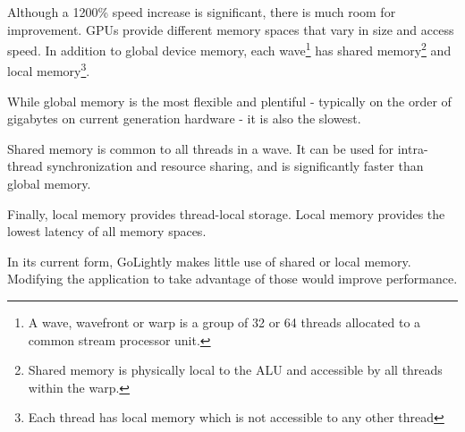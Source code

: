Although a 1200\% speed increase is significant, there is much room for improvement. GPUs provide different memory spaces that vary in size and access speed. In addition to global device memory, each wave\footnote{A wave, wavefront or warp is a group of 32 or 64 threads allocated to a common stream processor unit.} has shared memory\footnote{Shared memory is physically local to the ALU and accessible by all threads within the warp.} and local memory\footnote{Each thread has local memory which is not accessible to any other thread}.

While global memory is the most flexible and plentiful - typically on the order of gigabytes on current generation hardware - it is also the slowest. 

Shared memory is common to all threads in a wave. It can be used for intra-thread synchronization and resource sharing, and is significantly faster than global memory.

Finally, local memory provides thread-local storage. Local memory provides the lowest latency of all memory spaces.

In its current form, GoLightly makes little use of shared or local memory. Modifying the application to take advantage of those would improve performance.







